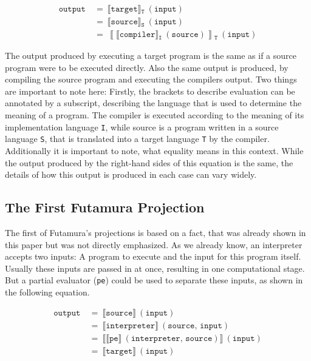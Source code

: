 \begin{align*}
  \mathtt{output}\
  &=\ \llbracket \mathtt{target} \rrbracket \mathtt{_T}\ (\mathtt{input}) \\
  &=\ \llbracket \mathtt{source} \rrbracket \mathtt{_S}\ (\mathtt{input}) \\
  &=\ \left\llbracket \llbracket \mathtt{compiler} \rrbracket \mathtt{_I}\ (\mathtt{source}) \right\rrbracket\mathtt{_T}\ (\mathtt{input})
\end{align*}

The output produced by executing a target program is the same as if a source program were to be executed directly.
Also the same output is produced, by compiling the source program and executing the compilers output.
Two things are important to note here: %
Firstly, the brackets to describe evaluation can be annotated by a subscript, describing the language that is used to determine the meaning of a program.
The compiler is executed according to the meaning of its implementation language \texttt{I}, while source is a program written in a source language \texttt{S}, that is translated into a target language \texttt{T} by the compiler.
Additionally it is important to note, what equality means in this context.
While the output produced by the right-hand sides of this equation is the same, the details of how this output is produced in each case can vary widely.


\subsection{The First Futamura Projection}\label{sec:futamura-first}

The first of Futamura's projections is based on a fact, that was already shown in this paper but was not directly emphasized.
As we already know, an interpreter accepts two inputs: A program to execute and the input for this program itself.
Usually these inputs are passed in at once, resulting in one computational stage.
But a partial evaluator (\texttt{pe}) could be used to separate these inputs, as shown in the following equation.

\begin{align}
  \mathtt{output}\
  &=\ \llbracket \mathtt{source} \rrbracket \ (\mathtt{input}) \\
  &=\ \llbracket \mathtt{interpreter} \rrbracket \ (\mathtt{source},\, \mathtt{input}) \\
  &=\ \llbracket \llbracket \mathtt{pe} \rrbracket \ (\mathtt{interpreter},\, \mathtt{source}) \rrbracket \ (\mathtt{input}) \label{eqn:pe-fut-1} \\
  &=\ \llbracket \mathtt{target} \rrbracket \ (\mathtt{input})
\end{align}

